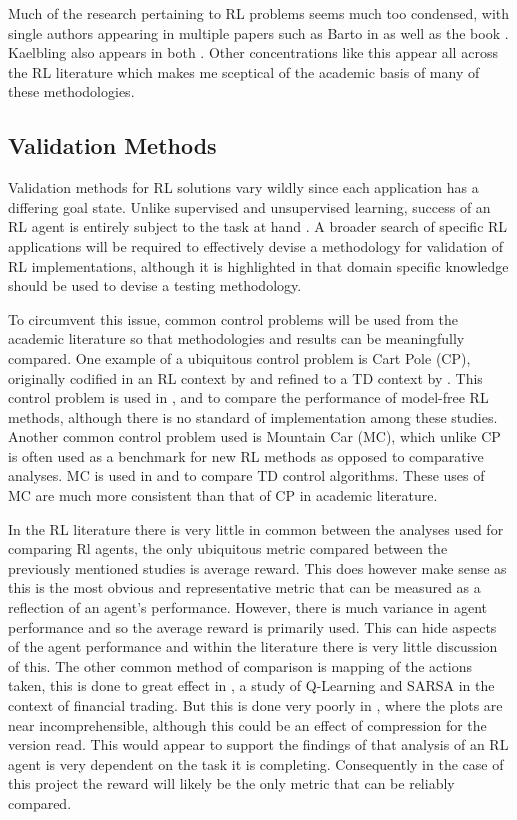 \documentclass[hidelinks,journal]{IEEEtran}
\begin{document}
Much of the research pertaining to RL problems seems much too condensed, with single authors appearing in multiple papers such as Barto in \textcite{Barto03} as well as the book \textcite{Sutton18}. Kaelbling also appears in both \textcite{Kaelbling96, Smart02}. Other concentrations like this appear all across the RL literature which makes me sceptical of the academic basis of many of these methodologies.
\subsection{Validation Methods}
\label{subsec:lrValidation}
Validation methods for RL solutions vary wildly since each application has a differing goal state. Unlike supervised and unsupervised learning, success of an RL agent is entirely subject to the task at hand \parencite{Kaelbling96, Busoniu08, Kober13}. A broader search of specific RL applications will be required to effectively devise a methodology for validation of RL implementations, although it is highlighted in \textcite{Shoham03} that domain specific knowledge should be used to devise a testing methodology.

To circumvent this issue, common control problems will be used from the academic literature so that methodologies and results can be meaningfully compared. One example of a ubiquitous control problem is Cart Pole (CP), originally codified in an RL context by \textcite{Barto83} and refined to a TD context by \textcite{Moore90}. This control problem is used in \textcite{Nagendra18}, \textcite{Wang13} and \textcite{Seijen09} to compare the performance of model-free RL methods, although there is no standard of implementation among these studies. Another common control problem used is Mountain Car (MC), which unlike CP is often used as a benchmark for new RL methods as opposed to comparative analyses. MC is used in \textcite{Waldock08} and \textcite{Wang13} to compare TD control algorithms. These uses of MC are much more consistent than that of CP in academic literature.

In the RL literature there is very little in common between the analyses used for comparing Rl agents, the only ubiquitous metric compared between the previously mentioned studies is average reward. This does however make sense as this is the most obvious and representative metric that can be measured as a reflection of an agent’s performance. However, there is much variance in agent performance and so the average reward is primarily used. This can hide aspects of the agent performance and within the literature there is very little discussion of this. The other common method of comparison is mapping of the actions taken, this is done to great effect in \textcite{Corozza15}, a study of Q-Learning and SARSA in the context of financial trading. But this is done very poorly in \textcite{Nagendra18}, where the plots are near incomprehensible, although this could be an effect of compression for the version read. This would appear to support the findings of \textcite{Shoham03} that analysis of an RL agent is very dependent on the task it is completing. Consequently in the case of this project the reward will likely be the only metric that can be reliably compared.
\end{document}
